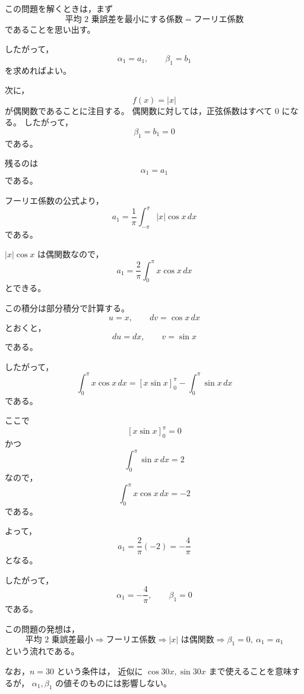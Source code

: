 \begin{strategy}
	この問題を解くときは，まず
	\[
	\text{平均 \(2\) 乗誤差を最小にする係数}
	=
	\text{フーリエ係数}
	\]
	であることを思い出す。
	
	したがって，
	\[
	\alpha_1=a_1,\qquad \beta_1=b_1
	\]
	を求めればよい。
	
	次に，
	\[
	f(x)=|x|
	\]
	が偶関数であることに注目する。
	偶関数に対しては，正弦係数はすべて \(0\) になる。
	したがって，
	\[
	\beta_1=b_1=0
	\]
	である。
	
	残るのは
	\[
	\alpha_1=a_1
	\]
	である。
	
	フーリエ係数の公式より，
	\[
	a_1=\frac{1}{\pi}\int_{-\pi}^{\pi}|x|\cos x\,dx
	\]
	である。
	
	\(|x|\cos x\) は偶関数なので，
	\[
	a_1=\frac{2}{\pi}\int_0^\pi x\cos x\,dx
	\]
	とできる。
	
	この積分は部分積分で計算する。
	\[
	u=x,\qquad dv=\cos x\,dx
	\]
	とおくと，
	\[
	du=dx,\qquad v=\sin x
	\]
	である。
	
	したがって，
	\[
	\int_0^\pi x\cos x\,dx
	=
	[x\sin x]_0^\pi-\int_0^\pi \sin x\,dx
	\]
	である。
	
	ここで
	\[
	[x\sin x]_0^\pi=0
	\]
	かつ
	\[
	\int_0^\pi \sin x\,dx=2
	\]
	なので，
	\[
	\int_0^\pi x\cos x\,dx=-2
	\]
	である。
	
	よって，
	\[
	a_1=\frac{2}{\pi}(-2)=-\frac{4}{\pi}
	\]
	となる。
	
	したがって，
	\[
	\alpha_1=-\frac{4}{\pi},
	\qquad
	\beta_1=0
	\]
	である。
	
	この問題の発想は，
	\[
	\text{平均 \(2\) 乗誤差最小}
	\Rightarrow
	\text{フーリエ係数}
	\Rightarrow
	|x|\text{ は偶関数}
	\Rightarrow
	\beta_1=0,\ \alpha_1=a_1
	\]
	という流れである。
	
	なお，\(n=30\) という条件は，
	近似に \(\cos 30x,\sin 30x\) まで使えることを意味するが，
	\(\alpha_1,\beta_1\) の値そのものには影響しない。
\end{strategy}